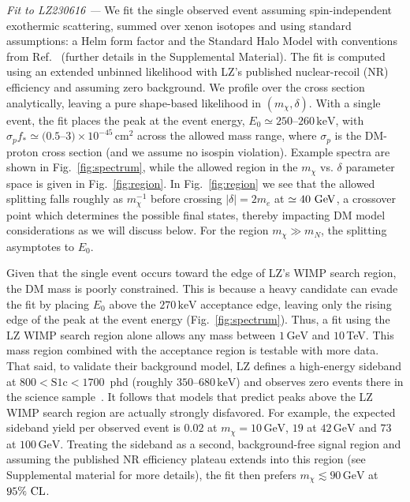 \documentclass[aps,prl,twocolumn,superscriptaddress,nofootinbib,floatfix,longbibliography]{revtex4-2}
\newcommand{\keV}{\ensuremath{\,\mathrm{keV}}}
\newcommand{\GeV}{\ensuremath{\,\mathrm{GeV}}}
\newcommand{\cms}{\ensuremath{\,\mathrm{cm^2}}}
\newcommand{\mchi}{\ensuremath{m_\chi}}
\begin{document}
\emph{Fit to LZ230616 ---}
We fit the single observed event assuming spin-independent exothermic scattering, summed over xenon isotopes and using standard assumptions: a Helm form factor and the Standard Halo Model with conventions from Ref.~\cite{Baxter:2021pqo} (further details in the Supplemental Material). The fit is computed using an extended unbinned likelihood with LZ's published nuclear-recoil (NR) efficiency and assuming zero background. We profile over the cross section analytically, leaving a pure shape-based likelihood in $(\mchi,\delta)$. With a single event, the fit places the peak at the event energy, $E_0 \simeq 250$--$260\keV$, with $\sigma_p f_* \simeq (0.5$--$3)\times10^{-45}\cms$ across the allowed mass range, where $\sigma_p$ is the DM-proton cross section (and we assume no isospin violation). Example spectra are shown in Fig.~\ref{fig:spectrum}, while the allowed region in the $m_\chi$ vs. $\delta$ parameter space is given in Fig.~\ref{fig:region}. In Fig.~\ref{fig:region} we see that the allowed splitting falls roughly as $m_{\chi}^{-1}$  before crossing $|\delta| = 2m_e$ at $\simeq 40~{\rm GeV}$, a crossover point which determines the possible final states, thereby impacting DM model considerations as we will discuss below. For the region $m_\chi \gg m_N$, the splitting asymptotes to $E_0$.

Given that the single event occurs toward the edge of LZ's WIMP search region, the DM mass is poorly constrained. This is because a heavy candidate can evade the fit by placing $E_0$ above the $270\keV$ acceptance edge, leaving only the rising edge of the peak at the event energy (Fig.~\ref{fig:spectrum}). Thus, a fit using the LZ WIMP search region alone allows any mass between $1\GeV$ and $10\,$TeV. This mass region combined with the acceptance region is testable with more data. That said, to validate their background model, LZ defines a high-energy sideband at $800 < \mathrm{S1c} < 1700$~phd (roughly $350$--$680\keV$) and observes zero events there in the science sample~\cite{LZ:2026axp}. It follows that models that predict peaks above the LZ WIMP search region are actually strongly disfavored. For example, the expected sideband yield per observed event is $0.02$ at $\mchi = 10\GeV$, $19$ at $42\GeV$ and $73$ at $100\GeV$. Treating the sideband as a second, background-free signal region and assuming the published NR efficiency plateau extends into this region (see Supplemental material for more details), the fit then prefers $\mchi \lesssim 90\GeV$ at $95\%~{\rm CL}$.
\end{document}
